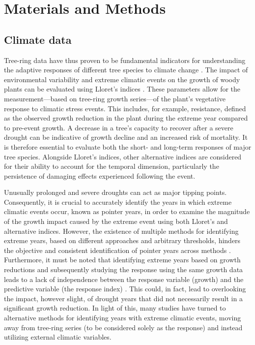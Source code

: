 \documentclass[12pt, a4paper]{article}
\begin{document}
\section{Materials and Methods}

\subsection{Climate data}

Tree-ring data have thus proven to be fundamental indicators for understanding the adaptive responses of different tree species to climate change \parencite{vieira2021}. The impact of environmental variability and extreme climatic events on the growth of woody plants can be evaluated using Lloret’s indices \parencite{Lloret2011}. These parameters allow for the measurement—based on tree-ring growth series—of the plant's vegetative response to climatic stress events. This includes, for example, resistance, defined as the observed growth reduction in the plant during the extreme year compared to pre-event growth. A decrease in a tree's capacity to recover after a severe drought can be indicative of growth decline and an increased risk of mortality. It is therefore essential to evaluate both the short- and long-term responses of major tree species. Alongside Lloret’s indices, other alternative indices are considered for their ability to account for the temporal dimension, particularly the persistence of damaging effects experienced following the event.

Unusually prolonged and severe droughts can act as major tipping points. Consequently, it is crucial to accurately identify the years in which extreme climatic events occur, known as pointer years, in order to examine the magnitude of the growth impact caused by the extreme event using both Lloret’s and alternative indices. However, the existence of multiple methods for identifying extreme years, based on different approaches and arbitrary thresholds, hinders the objective and consistent identification of pointer years across methods \parencite{buras2020}. Furthermore, it must be noted that identifying extreme years based on growth reductions and subsequently studying the response using the same growth data leads to a lack of independence between the response variable (growth) and the predictive variable (the response index) \parencite{rubio-cuadrado2025}. This could, in fact, lead to overlooking the impact, however slight, of drought years that did not necessarily result in a significant growth reduction. In light of this, many studies have turned to alternative methods for identifying years with extreme climatic events, moving away from tree-ring series (to be considered solely as the response) and instead utilizing external climatic variables.
\end{document}

